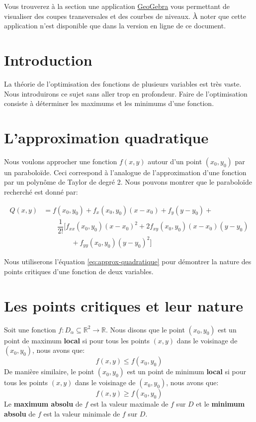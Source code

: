 \documentclass[]{book}
\theoremstyle{definition}
\theoremstyle{definition}
\theoremstyle{definition}
\theoremstyle{remark}
\let\BeginKnitrBlock\begin \let\EndKnitrBlock\end
\begin{document}
Vous trouverez à la section une application
\href{https://www.geogebra.org/?lang=fr}{GeoGebra} vous permettant de
visualiser des coupes transversales et des courbes de niveaux. À noter
que cette application n'est disponible que dans la version en ligne de
ce document.

\hypertarget{introduction-5}{%
\section{Introduction}\label{introduction-5}}

La théorie de l'optimisation des fonctions de plusieurs variables est
très vaste. Nous introduirons ce sujet sans aller trop en profondeur.
Faire de l'optimisation consiste à déterminer les maximums et les
minimums d'une fonction.

\hypertarget{lapproximation-quadratique}{%
\section{L'approximation quadratique}\label{lapproximation-quadratique}}

Nous voulons approcher une fonction \(f(x,y)\) autour d'un point
\((x_0,y_0)\) par un paraboloïde. Ceci correspond à l'analogue de
l'approximation d'une fonction par un polynôme de Taylor de degré 2.
Nous pouvons montrer que le paraboloïde recherché est donné par:

\begin{equation}
\begin{split}
Q(x,y) &= f(x_0,y_0)+f_x(x_0,y_0)(x-x_0)+f_y(y-y_0)+ \\
&\qquad \dfrac{1}{2!}[f_{xx}(x_0,y_0)(x-x_0)^2+2f_{xy}(x_0,y_0)(x-x_0)(y-y_0) \\
& \qquad \qquad +f_{yy}(x_0,y_0)(y-y_0)^2]
\end{split}
\label{eq:approx-quadratique}
\end{equation}

Nous utiliserons l'équation \eqref{eq:approx-quadratique} pour démontrer
la nature des points critiques d'une fonction de deux variables.

\hypertarget{les-points-critiques-et-leur-nature}{%
\section{Les points critiques et leur
nature}\label{les-points-critiques-et-leur-nature}}

\BeginKnitrBlock{definition}
\protect\hypertarget{def:unnamed-chunk-210}{}{\label{def:unnamed-chunk-210}
}Soit une fonction
\(f:D_{\alpha}\subseteq \mathbb{R}^2 \rightarrow \mathbb{R}\). Nous
disons que le point \((x_0,y_0)\) est un point de maximum \textbf{local}
si pour tous les points \((x,y)\) dans le voisinage de \((x_0,y_0)\),
nous avons que: \[ f(x,y) \leq f(x_0,y_0) \] De manière similaire, le
point \((x_0,y_0)\) est un point de minimum \textbf{local} si pour tous
les points \((x,y)\) dans le voisinage de \((x_0,y_0)\), nous avons que:
\[ f(x,y) \geq f(x_0,y_0) \] Le \textbf{maximum absolu} de \(f\) est la
valeur maximale de \(f\) sur \(D\) et le \textbf{minimum absolu} de
\(f\) est la valeur minimale de \(f\) sur \(D\).
\EndKnitrBlock{definition}
\end{document}
